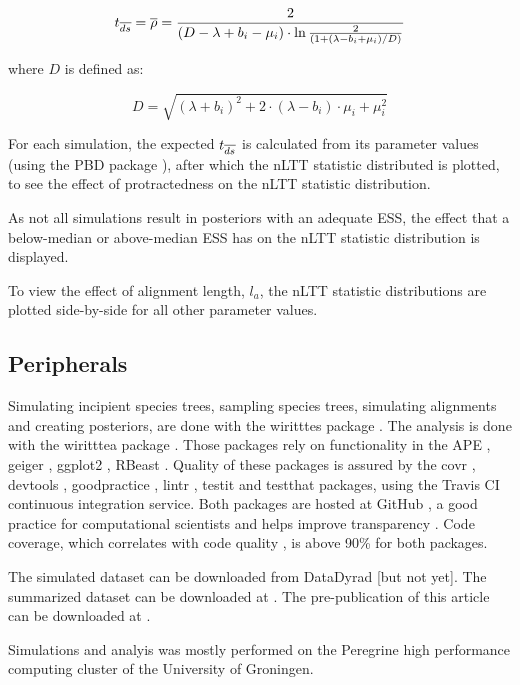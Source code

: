 \begin{equation}
    t_{\overline{ds}} = \overline{\rho} = \frac{2}{ (D - \lambda + b_i - \mu_i) \cdot \ln{ \frac{2}{(1 + (\lambda - b_i + \mu_i)/D)}  } }
\end{equation}

where $D$ is defined as:

\begin{equation}
    D = \sqrt{ (\lambda + b_i)^2 + 2 \cdot (\lambda - b_i) \cdot \mu_i + \mu_i^2 }
\end{equation}

For each simulation, the expected $t_{\overline{ds}}$ is calculated from its parameter 
values (using the PBD package \cite{PBD}), after which the nLTT statistic 
distributed is plotted, to see the effect of protractedness on the nLTT statistic
distribution.

As not all simulations result in posteriors with an adequate ESS, the
effect that a below-median or above-median ESS has on the nLTT statistic
distribution is displayed. 

To view the effect of alignment length, $l_a$, the nLTT statistic
distributions are plotted side-by-side for all other parameter values. 

\subsection{Peripherals}

Simulating incipient species trees, sampling species trees, simulating alignments
and creating posteriors, are done with the wiritttes package \cite{wiritttes}. The
analysis is done with the wiritttea package \cite{wiritttea}. Those packages rely on 
functionality in the APE \cite{APE}, geiger \cite{GEIGER}, ggplot2 \cite{ggplot2}, 
RBeast \cite{RBeast}. Quality of these packages is assured by 
the covr \cite{covr}, devtools \cite{devtools}, 
goodpractice \cite{goodpractice}, lintr \cite{lintr}, testit \cite{testit} 
and testthat \cite{testthat} packages, using the Travis CI \cite{travis} continuous integration service. 
Both packages are hosted at GitHub \cite{github}, a good practice for computational
scientists \cite{perez2016ten} and helps improve transparency \cite{gorgolewski2016practical}.
Code coverage, which correlates with code quality \cite{del1995correlation}, 
is above 90\% for both packages.

The simulated dataset can be downloaded from DataDyrad [but not yet]. The
summarized dataset can be downloaded at \cite{wirittte_data}. The
pre-publication of this article can be downloaded at \cite{wirittte_article}. 

Simulations and analyis was mostly performed on the Peregrine 
high performance computing cluster of the University of Groningen.
